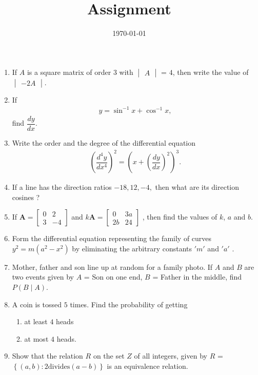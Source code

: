 \documentclass[12pt,-letter paper]{article}
\title{Assignment}
\date{\today}
\let\vec\mathbf{}
\let\vec\mathbf{}
\let\vec\mathbf{}
\providecommand{\mydet}[1]{\ensuremath{\begin{vmatrix}#1\end{vmatrix}}}
\providecommand{\myvec}[1]{\ensuremath{\begin{bmatrix}#1\end{bmatrix}}}
\providecommand{\cbrak}[1]{\ensuremath{\left\{#1\right\}}}
\providecommand{\brak}[1]{\ensuremath{\left(#1\right)}}
\begin{document}
\begin{enumerate}
\item If $A$ is a square matrix of order $3$ with   $\mydet{A}$ = $4$, then write the value of $\mydet {-2 A}$.

\item If
\begin{align*}
    y = \sin ^{-1} {x} + \cos^{-1} {x},
\end{align*}
 find $\dfrac{dy}{dx}$.
 
\item Write the order and the degree of the differential equation
\begin{align*}
    \brak{\dfrac{d^4y}{dx^4}}^2=\brak{x+\brak{\dfrac{dy}{dx}}^2}^3.
\end{align*}

\item If a line has the direction ratios $-18, 12, -4,$ then what are its direction cosines ? 

\item If $\vec{A}=\myvec{0&2\\3&-4}$ and $ k \vec{A}=\myvec{0&3a\\2b&24}$ , then find the values of $k$, $a$ and $b$.

\item Form the differential equation representing the family of curves $y^2=m\brak{a^2-x^2}$ by eliminating the arbitrary constants $'m'$ and $'a'$ .

\item Mother, father and son line up at random for a family photo. If $A$ and $B$ are two events given by $A$ = Son on one end, $B$ = Father in the middle, find $P(B\mid A)$.

\item A coin is tossed $5$ times. Find the probability of getting \begin{enumerate}[label=\roman*.]
    \item  at least $4$ heads
    \item at most $4$ heads.
    \end{enumerate}
    
\item Show that the relation $R$ on the set $Z$ of all integers, given by $R$ =$\cbrak {\brak{a, b}:2 \text{divides} \brak{a - b}}$ is an equivalence relation.


\end{enumerate}
\end{document}
